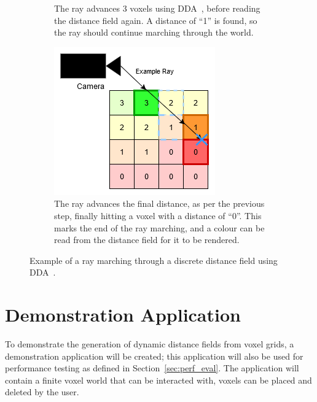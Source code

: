 \begin{figure}[htbp]
\begin{subfigure}[t]{0.32\textwidth}
        \caption{The ray advances 3 voxels using DDA~\protect\cite{amanatides1987fast}, before reading the distance
            field again. A distance of ``1'' is found, so the ray should continue marching through the world.}
    \end{subfigure}
    \hfill
    \begin{subfigure}[t]{0.32\textwidth}
        \centering
        \includegraphics[width=\textwidth]{figures/df_dda_3.drawio.png}
        \caption{The ray advances the final distance, as per the previous step, finally hitting a voxel with a distance
            of ``0''. This marks the end of the ray marching, and a colour can be read from the distance field for it to
            be rendered.}
    \end{subfigure}
    \caption{Example of a ray marching through a discrete distance field using DDA~\protect\cite{amanatides1987fast}.}
    \label{fig:df_dda}
\end{figure}

\section{Demonstration Application} \label{sec:demo_app}
To demonstrate the generation of dynamic distance fields from voxel grids, a demonstration application will be
created; this application will also be used for performance testing as defined in Section~\ref{sec:perf_eval}. The
application will contain a finite voxel world that can be interacted with, voxels can be placed and deleted by the user.


